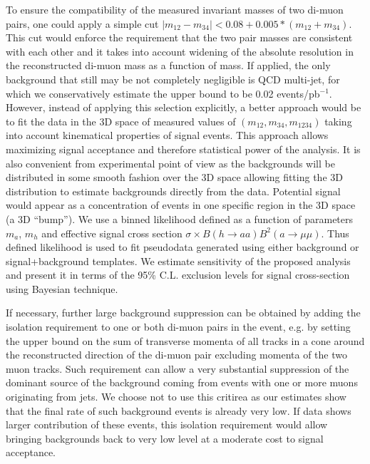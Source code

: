 \documentclass[aps,prl,twocolumn,nofootinbib,superscriptaddress]{revtex4}
\begin{document}
{To ensure the compatibility of the measured invariant masses of two di-muon pairs, one could apply 
a simple cut $|m_{12}-m_{34}|<0.08+0.005*(m_{12}+m_{34})$.  This cut would
enforce the requirement that the two pair masses are consistent with each other and 
it takes into account widening of the absolute resolution in the reconstructed di-muon
mass as a function of mass. If applied, the only background that still may be not completely 
negligible is QCD multi-jet, for which we conservatively estimate the upper bound to be 0.02 
events/pb$^{-1}$. However, instead of applying this selection explicitly, a better approach would 
be to fit the data in the 3D space of 
measured values of $(m_{12},m_{34}, m_{1234})$ taking into account
kinematical properties of  signal events. This approach allows maximizing signal
acceptance and therefore statistical power of the analysis. It is also convenient from 
experimental point of view as the backgrounds
will  be distributed in some smooth fashion over the 3D space allowing fitting the 3D
distribution to estimate  backgrounds directly from the data. Potential signal would
appear as a concentration of events in one specific  region in the 3D space (a 3D
``bump''). We use a binned likelihood defined as a function of parameters $m_a$, 
$m_h$ and effective signal cross section $\sigma \times B (h \to aa) B^2(a \to \mu \mu)$. 
Thus defined likelihood is used to fit pseudodata generated using either background or 
signal+background templates. We estimate sensitivity of the proposed analysis and present 
it in terms of the 95\% C.L. exclusion levels for signal cross-section using Bayesian 
technique.

If necessary, further large background suppression can be obtained by adding the isolation requirement 
to one or both di-muon pairs in the event, e.g. by setting the upper bound on the sum of transverse momenta 
of all tracks in a cone around the reconstructed direction of the di-muon pair excluding momenta of the 
two muon tracks. Such requirement can allow a very substantial suppression of the dominant source of the background coming from events with one or more 
muons originating from jets. We choose not to use this critirea as our estimates show that the final rate 
of such background events is already very low. If data shows larger contribution of these events, 
this isolation requirement would allow bringing backgrounds back to very low level at a moderate
cost to signal acceptance.




}
\end{document}
